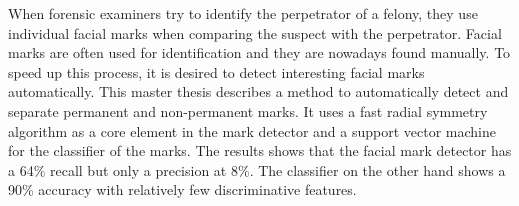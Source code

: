 When forensic examiners try to identify the perpetrator of a felony, they use individual facial marks when comparing the suspect with the perpetrator. Facial marks are often used for identification and they are nowadays  found manually. To speed up this process, it is desired to detect interesting facial marks automatically. This master thesis describes a method to automatically detect and separate permanent and non-permanent marks. It uses a fast radial symmetry algorithm as a core element in the mark detector and a support vector machine for the classifier of the marks. The results shows that the facial mark detector has a 64\% recall but only a precision at 8\%. The classifier on the other hand shows a 90\% accuracy with relatively few discriminative features.   
